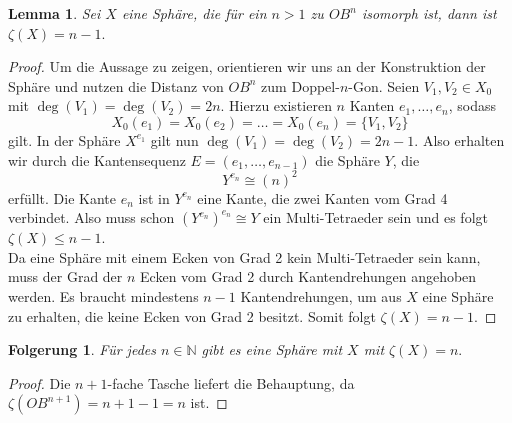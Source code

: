 \documentclass[12pt,titlepage,twoside,cleardoublepage]{article}
\theoremstyle{nummermitklammern}
\newtheorem{lemma}[temp]{Lemma}
\newtheorem{folgerung}[temp]{Folgerung}
\newtheorem{lemma}[zahl]{Lemma}
\newtheorem{folgerung}[zahl]{Folgerung}
\numberwithin{equation}{section}
\begin{document}
\begin{lemma}
Sei $X$ eine Sphäre, die für ein $n>1$ zu $OB^n$ isomorph ist, dann ist $\zeta(X)=n-1.$
\end{lemma}
\begin{proof}
Um die Aussage zu zeigen, orientieren wir uns an der Konstruktion der Sphäre und nutzen die Distanz von $OB^n$ zum Doppel-$n$-Gon. Seien $V_1,V_2\in X_0$ mit $\deg(V_1)=\deg(V_2)=2n$. Hierzu existieren $n$ Kanten $e_1,\ldots,e_n$, sodass 
\[
X_0(e_1)=X_0(e_2)=\ldots=X_0(e_n)=\{V_1,V_2\}
\] gilt.
In der Sphäre $X^{e_1}$ gilt nun $\deg(V_1)=\deg(V_2)=2n-1$. Also erhalten wir durch die Kantensequenz $E=(e_1,\ldots,e_{n-1})$ die Sphäre $Y$, die 
\[
Y^{e_n}\cong (n)^2
\] erfüllt. Die Kante $e_n$ ist in $Y^{e_n}$ eine Kante, die zwei Kanten vom Grad 4 verbindet. Also muss schon ${(Y^{e_n})}^{e_n}\cong Y$ ein Multi-Tetraeder sein und
 es folgt $\zeta(X)\leq n-1$. \\
Da eine Sphäre mit einem Ecken von Grad 2 kein Multi-Tetraeder sein kann, muss der Grad der $n$ Ecken vom Grad 2 durch Kantendrehungen angehoben werden. Es braucht mindestens $n-1$ Kantendrehungen, um aus $X$ eine Sphäre zu erhalten, die keine Ecken von Grad 2 besitzt. Somit folgt $\zeta(X)=n-1.$
\end{proof}
\begin{folgerung}
Für jedes $n \in \mathbb{N}$ gibt es eine Sphäre mit $X$ mit $\zeta(X)=n.$
\end{folgerung}
\begin{proof}
Die $n+1$-fache Tasche liefert die Behauptung, da $\zeta(OB^{n+1})=n+1-1=n$ ist.
\end{proof}
\end{document}
